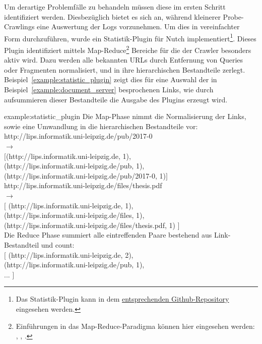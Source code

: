 Um derartige Problemfälle zu behandeln müssen diese im ersten Schritt identifiziert werden.
Diesbezüglich bietet es sich an, während kleinerer Probe-Crawlings eine Auswertung der Logs vorzunehmen.
Um dies in vereinfachter Form durchzuführen,
wurde ein Statistik-Plugin für Nutch implementiert\footnote{Das Statistik-Plugin kann in dem
\href{https://github.com/DaniloMorgado/url_statistic_plugin}{entsprechenden Github-Repository} eingesehen werden.}.
Dieses Plugin identifiziert mittels
Map-Reduce\footnote{Einführungen in das Map-Reduce-Paradigma können hier eingesehen werden: \cite{wiki.mapreduce},
\cite{nosql.mapreduce}, \cite{hadoop.mapreduce}.}
Bereiche für die der Crawler besonders aktiv wird.
Dazu werden alle bekannten URLs durch Entfernung
von Queries oder Fragmenten normalisiert, und in ihre hierarchischen Bestandteile zerlegt.
Beispiel~\ref{example:statistic_plugin} zeigt dies für eine Auswahl der in
Beispiel~\ref{example:document_server} besprochenen Links,
wie durch aufsummieren dieser Bestandteile die Ausgabe des Plugins erzeugt wird.

\begin{example}{example:statistic_plugin}
Die Map-Phase nimmt die Normalisierung der Links, sowie eine Umwandlung in die hierarchischen Bestandteile vor:\\

http://lips.informatik.uni-leipzig.de/pub/2017-0\\
$\rightarrow$ \\
$[$(http://lips.informatik.uni-leipzig.de, 1),\\
(http://lips.informatik.uni-leipzig.de/pub, 1),\\
(http://lips.informatik.uni-leipzig.de/pub/2017-0, 1)$]$\\

http://lips.informatik.uni-leipzig.de/files/thesis.pdf\\
$\rightarrow$\\
$[$
(http://lips.informatik.uni-leipzig.de, 1), \\
(http://lips.informatik.uni-leipzig.de/files, 1), \\
(http://lips.informatik.uni-leipzig.de/files/thesis.pdf, 1)
$]$\\

Die Reduce Phase summiert alle eintreffenden Paare bestehend aus Link-Bestandteil und count:\\

$[$
(http://lips.informatik.uni-leipzig.de, 2), \\
(http://lips.informatik.uni-leipzig.de/pub, 1), \\
...
$]$
\end{example}
	
